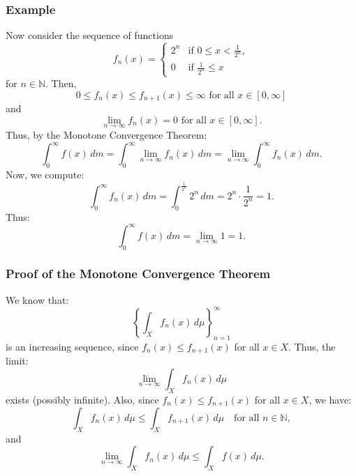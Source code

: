 \documentclass[11pt]{article}
\begin{document}
\subsubsection*{Example}
Now consider the sequence of functions
\[f_n(x) = \begin{cases}
    2^n & \text{if } 0 \leq x < \frac{1}{2^n}, \\
    0 & \text{if } \frac{1}{2^n} \leq x 
\end{cases}\]
for \(n \in \mathbb{N}\). Then,
\[0 \leq f_n(x) \leq f_{n+1}(x) \leq \infty \text{ for all } x \in [0, \infty]\]
and
\[\lim_{n \to \infty} f_n(x) = 0 \text{ for all } x \in [0, \infty].\]
Thus, by the Monotone Convergence Theorem:
\[\int_0^{\infty} f(x) \,dm = \int_0^{\infty} \lim_{n \to \infty} f_n(x) \,dm = \lim_{n \to \infty} \int_0^{\infty} f_n(x) \,dm.\]
Now, we compute:
\[\int_0^{\infty} f_n(x) \,dm = \int_0^{\frac{1}{2^n}} 2^n \,dm = 2^n \cdot \frac{1}{2^n} = 1.\]
Thus:
\[\int_0^{\infty} f(x) \,dm = \lim_{n \to \infty} 1 = 1.\]

\begin{center}
\end{center}

\subsubsection{Proof of the Monotone Convergence Theorem}
We know that:
\[\left\{\int_X f_n(x) \,d\mu\right\}_{n=1}^{\infty}\]
is an increasing sequence, since \(f_n(x) \leq f_{n+1}(x)\) for all \(x \in X\). Thus, the limit:
\[\lim_{n \to \infty} \int_X f_n(x) \,d\mu\]
exists (possibly infinite). Also, since \(f_n(x) \leq f_{n+1}(x)\) for all \(x \in X\), we have:  
\[\int_X f_n(x) \,d\mu \leq \int_X f_{n+1}(x) \,d\mu \quad \text{for all } n \in \mathbb{N},\]
and 
\[\lim_{n \to \infty} \int_X f_n(x) \,d\mu \leq \int_X f(x) \,d\mu.\]
\end{document}
